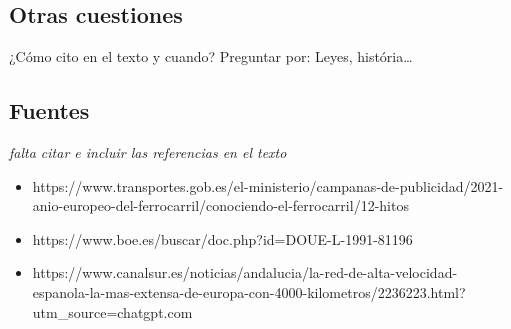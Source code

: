 \documentclass[
  letterpaper,
  DIV=11,
  numbers=noendperiod]{scrartcl}
\providecommand{\tightlist}{%
  \setlength{\itemsep}{0pt}\setlength{\parskip}{0pt}}
\begin{document}
\subsection{Otras cuestiones}\label{otras-cuestiones}

¿Cómo cito en el texto y cuando? Preguntar por: Leyes, história\ldots{}

\subsection{Fuentes}\label{fuentes}

\emph{falta citar e incluir las referencias en el texto}

\begin{itemize}
\tightlist
\item
  https://www.transportes.gob.es/el-ministerio/campanas-de-publicidad/2021-anio-europeo-del-ferrocarril/conociendo-el-ferrocarril/12-hitos
\item
  https://www.boe.es/buscar/doc.php?id=DOUE-L-1991-81196
\item
  https://www.canalsur.es/noticias/andalucia/la-red-de-alta-velocidad-espanola-la-mas-extensa-de-europa-con-4000-kilometros/2236223.html?utm\_source=chatgpt.com
\end{itemize}
\end{document}
